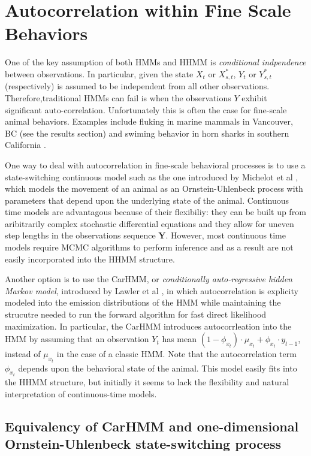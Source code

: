 
\section{Autocorrelation within Fine Scale Behaviors}

One of the key assumption of both HMMs and HHMM is \textit{conditional indpendence} between observations. In particular, given the state $X_t$ or $X^*_{s,t}$, $Y_t$ or $Y^*_{s,t}$ (respectively) is assumed to be independent from all other observations. Therefore,traditional HMMs can fail is when the observations $Y$ exhibit significant auto-correlation. Unfortunately this is often the case for fine-scale animal behaviors. Examples include fluking in marine mammals in Vancouver, BC (see the results section) and swiming behavior in horn sharks in southern California \cite{Adam:2019}.

One way to deal with autocorrelation in fine-scale behavioral processes is to use a state-switching continuous model such as the one introduced by Michelot et al \cite{Michelot:2019}, which models the movement of an animal as an Ornstein-Uhlenbeck process with parameters that depend upon the underlying state of the animal. Continuous time models are advantagous because of their flexibiliy: they can be built up from aribitrarily complex stochastic differential equations and they allow for uneven step lengths in the observations sequence $\mathbf{Y}$. However, most continuous time models require MCMC algorithms to perform inference and as a result are not easily incorporated into the HHMM structure.

Another option is to use the CarHMM, or \textit{conditionally auto-regressive hidden Markov model}, introduced by Lawler et al \cite{Lawler:2019}, in which autocorrelation is explicity modeled into the emission distributions of the HMM while maintaining the strucutre needed to run the forward algorithm for fast direct likelihood maximization. In particular, the CarHMM introduces autocorrleation into the HMM by assuming that an observation $Y_t$ has mean $(1-\phi_{x_t}) \cdot \mu_{x_t} + \phi_{x_t} \cdot y_{t-1}$, instead of $\mu_{x_t}$ in the case of a classic HMM. Note that the autocorrelation term $\phi_{x_t}$ depends upon the behavioral state of the animal. This model easily fits into the HHMM structure, but initially it seems to lack the flexibility and natural interpretation of continuous-time models.

\subsection{Equivalency of CarHMM and one-dimensional Ornstein-Uhlenbeck  state-switching process}

